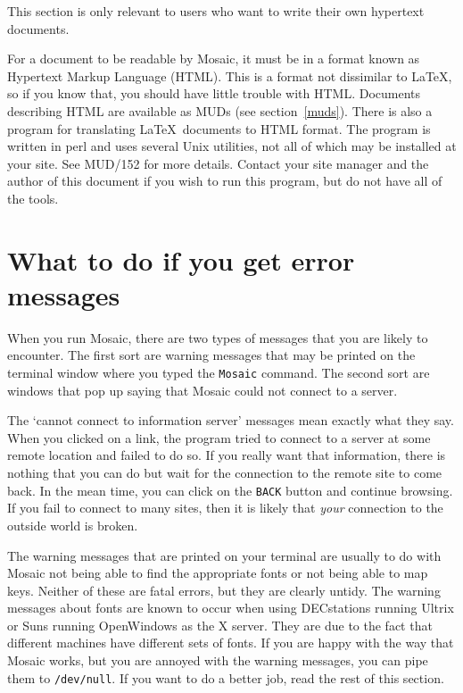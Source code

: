 This section is only relevant to users who want to write their own hypertext
documents.

For a document to be readable by Mosaic, it must be in a format known as
Hypertext Markup Language (HTML). This is a format not dissimilar to \LaTeX,
so if you know that, you should have little trouble with HTML. Documents
describing HTML are available as MUDs (see section~\ref{muds}). There is also a
program for translating \LaTeX\ documents to HTML format. The program is
written in perl and uses several Unix utilities, not all of which may be
installed at your site. See MUD/152 for more details. Contact your site manager
and the author of this document if you wish to run this program, but do not
have all of the tools.

\section{What to do if you get error messages}
\label{warnings}

When you run Mosaic, there are two types of messages that you are likely
to encounter. The first sort are warning messages that may be printed on the
terminal window where you typed the {\tt Mosaic} command. The second sort are
windows that pop up saying that Mosaic could not connect to a server.

The `cannot connect to information server' messages mean exactly what they say.
When you clicked on a link, the program tried to connect to a server at some
remote location and failed to do so. If you really want that information, there
is nothing that you can do but wait for the connection to the remote site to
come back. In the mean time, you can click on the {\tt BACK} button and
continue browsing. If you fail to connect to many sites, then it is likely that
{\em your} connection to the outside world is broken.

The warning messages that are printed on your terminal are usually to do with
Mosaic not being able to find the appropriate fonts or not being able to map
keys. Neither of these are fatal errors, but they are clearly untidy. The
warning messages about fonts are known to occur when using DECstations running
Ultrix or Suns running OpenWindows as the X server.
They are due to the fact that different machines have different sets of fonts.
If you are happy with the way that Mosaic works, but you are annoyed with the
warning messages, you can pipe them to {\tt /dev/null}. If you want to do a
better job, read the rest of this section.


